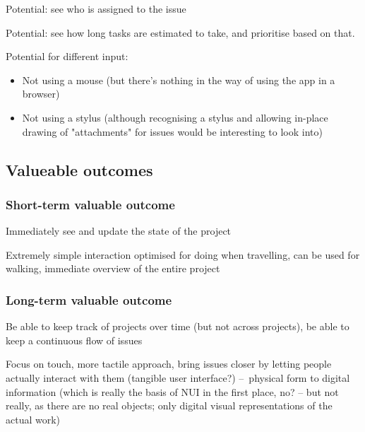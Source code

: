 Potential: see who is assigned to the issue

Potential: see how long tasks are estimated to take, and prioritise based on that.

Potential for different input:
\begin{itemize}
  \item Not using a mouse (but there's nothing in the way of using the app in a browser)
  \item Not using a stylus (although recognising a stylus and allowing in-place drawing of "attachments" for issues would be interesting to look into)
\end{itemize}

\subsection{Valueable outcomes}

\subsubsection{Short-term valuable outcome}

Immediately see and update the state of the project

Extremely simple interaction optimised for doing when travelling, can be used for walking, immediate overview of the entire project

\subsubsection{Long-term valuable outcome}

Be able to keep track of projects over time (but not across projects), be able to keep a continuous flow of issues %

Focus on touch, more tactile approach, bring issues closer by letting people actually interact with them (tangible user interface?) – physical form to digital information (which is really the basis of NUI in the first place, no? – but not really, as there are no real objects; only digital visual representations of the actual work)

